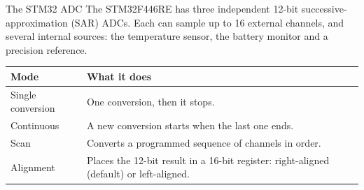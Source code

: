 \documentclass[9pt,aspectratio=169,xcolor=table]{beamer}
\begin{document}
\begin{frame}{The STM32 ADC}
    \leavevmode
    The STM32F446RE has \alert{three independent 12-bit successive-approximation (SAR) ADCs}. Each can sample up to 16 external channels, and several internal sources: the temperature sensor, the battery monitor and a precision reference.

    \vspace{3mm}
    \begin{center}
    {\small
    \striped
    \begin{tabular}{@{}l R{.62\textwidth}@{}}
        \toprule
        \textbf{Mode} & \textbf{What it does} \\
        \midrule
        Single conversion & One conversion, then it stops. \\
        Continuous & A new conversion starts when the last one ends. \\
        Scan & Converts a programmed sequence of channels in order. \\
        Alignment & Places the 12-bit result in a 16-bit register: right-aligned (default) or left-aligned. \\
        \bottomrule
    \end{tabular}}
    \end{center}
\end{frame}
\end{document}
